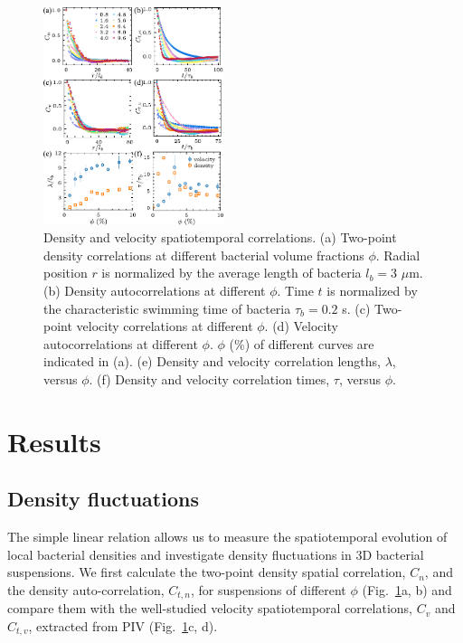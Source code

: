 \documentclass[twocolumn,aps,prx,amsmath,amssymb,longbibliography]{revtex4-2}
\begin{document}
\begin{figure}[t]
	\begin{center}
		\includegraphics[width=0.47\textwidth]{figures/fig-2.pdf}
		\caption[spatiotemporal-correlations.]
		{
			Density and velocity spatiotemporal correlations. (a) Two-point density correlations at different bacterial volume fractions $\phi$. Radial position $r$ is normalized by the average length of bacteria $l_b = 3$ $\mu$m. (b) Density autocorrelations at different $\phi$. Time $t$ is normalized by the characteristic swimming time of bacteria $\tau_b = 0.2$ s. (c) Two-point velocity correlations at different $\phi$. (d) Velocity autocorrelations at different $\phi$. $\phi$ ($\%$) of different curves are indicated in (a). (e) Density and velocity correlation lengths, $\lambda$, versus $\phi$. (f) Density and velocity correlation times, $\tau$, versus $\phi$.
		}
		\label{fig:spatiotemporal-correlations}
	\end{center}
\end{figure}




\section{Results}

\subsection{Density fluctuations}

The simple linear relation allows us to measure the spatiotemporal evolution of local bacterial densities and investigate density fluctuations in 3D bacterial suspensions. We first calculate the two-point density spatial correlation, $C_n$, and the density auto-correlation, $C_{t,n}$, for suspensions of different $\phi$ (Fig.~\ref{fig:spatiotemporal-correlations}a, b) and compare them with the well-studied velocity spatiotemporal correlations, $C_{v}$ and $C_{t,v}$, extracted from PIV (Fig.~\ref{fig:spatiotemporal-correlations}c, d).
\end{document}
